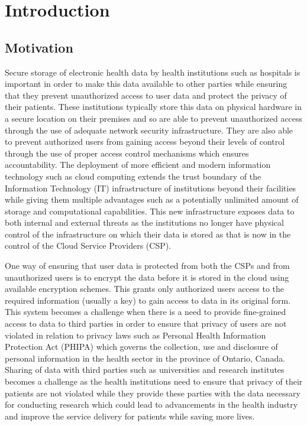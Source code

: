 \chapter{Introduction}
\label{chap:introduction}


\section{Motivation}

Secure storage of electronic health data by health institutions such as hospitals is important in order to make this data available to other parties while ensuring that they prevent unauthorized access to user data and protect the privacy of their patients. These institutions typically store this data on physical hardware in a secure location on their premises and so are able to prevent unauthorized access through the use of adequate network security infrastructure. They are also able to prevent authorized users from gaining access beyond their levels of control through the use of proper access control mechanisms which ensures accountability. The deployment of more efficient and modern information technology such as cloud computing extends the trust boundary of the Information Technology (IT) infrastructure of institutions beyond their facilities while giving them multiple advantages such as a potentially unlimited amount of storage and computational capabilities. This new infrastructure exposes data to both internal and external threats as the institutions no longer have physical control of the infrastructure on which their data is stored as that is now in the control of the Cloud Service Providers (CSP).

One way of ensuring that user data is protected from both the CSPs and from unauthorized users is to encrypt the data before it is stored in the cloud using available encryption schemes. This grants only authorized users access to the required information (usually a key) to gain access to data in its original form. This system becomes a challenge when there is a need to provide fine-grained access to data to third parties in order to ensure that privacy of users are not violated in relation to privacy laws such as Personal Health Information Protection Act (PHIPA) \cite{pihipa} which governs the collection, use and disclosure of personal information in the health sector in the province of Ontario, Canada. Sharing of data with third parties such as universities and research institutes becomes a challenge as the health institutions need to ensure that privacy of their patients are not violated while they provide these parties with the data necessary for conducting research which could lead to advancements in the health industry and improve the service delivery for patients while saving more lives.

